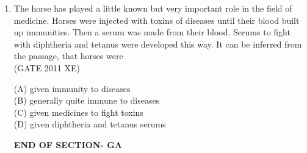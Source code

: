 \documentclass[journal,12pt,onecolumn]{IEEEtran}
\begin{document}
\begin{enumerate}
\item The horse has played a little known but very important role in the field of medicine. Horses were injected with toxins of diseases until their blood built up immunities. Then a serum was made from their blood. Serums to fight with diphtheria and tetanus were developed this way. It can be inferred from the passage, that horses were \\

\hfill{(GATE 2011 XE)} \\
\begin{multicols}{4}
(A) given immunity to diseases \\
(B) generally quite immune to diseases \\
(C) given medicines to fight toxins \\
(D) given diphtheria and tetanus serums
\end{multicols}


\vspace{3\baselineskip}
    \begin{center}
    \textbf{\Large END OF SECTION- GA}
    \end{center}
    
\end{enumerate}

\clearpage
\end{document}
